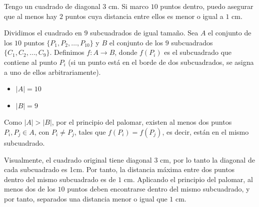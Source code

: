 \documentclass[a4paper,12pt]{article}
\begin{document}
\begin{ejemplo}[title=Ejemplo 3: Puntos en un cuadrado]
Tengo un cuadrado de diagonal $3$ cm. Si marco $10$ puntos dentro, puedo asegurar que al menos hay $2$ puntos cuya distancia entre ellos es menor o igual a $1$ cm.

Dividimos el cuadrado en $9$ subcuadrados de igual tamaño. Sea $A$ el conjunto de los $10$ puntos $\{P_1, P_2, \dots, P_{10}\}$ y $B$ el conjunto de los $9$ subcuadrados $\{C_1, C_2, \dots, C_9\}$. Definimos $f: A \to B$, donde $f(P_i)$ es el subcuadrado que contiene al punto $P_i$ (si un punto está en el borde de dos subcuadrados, se asigna a uno de ellos arbitrariamente).

\begin{itemize}
    \item $|A| = 10$
    \item $|B| = 9$
\end{itemize}

Como $|A| > |B|$, por el principio del palomar, existen al menos dos puntos $P_i, P_j \in A$, con $P_i \neq P_j$, tales que $f(P_i) = f(P_j)$, es decir, están en el mismo subcuadrado.

\vspace{5pt}

Visualmente, el cuadrado original tiene diagonal $3$ cm, por lo tanto la diagonal de cada subcuadrado es 1cm. Por tanto, la distancia máxima entre dos puntos dentro del mismo subcuadrado es de $1$ cm.  
Aplicando el principio del palomar, al menos dos de los $10$ puntos deben encontrarse dentro del mismo subcuadrado, y por tanto, separados una distancia menor o igual que $1$ cm.

\begin{center}
\end{center}
\end{ejemplo}
\end{document}
